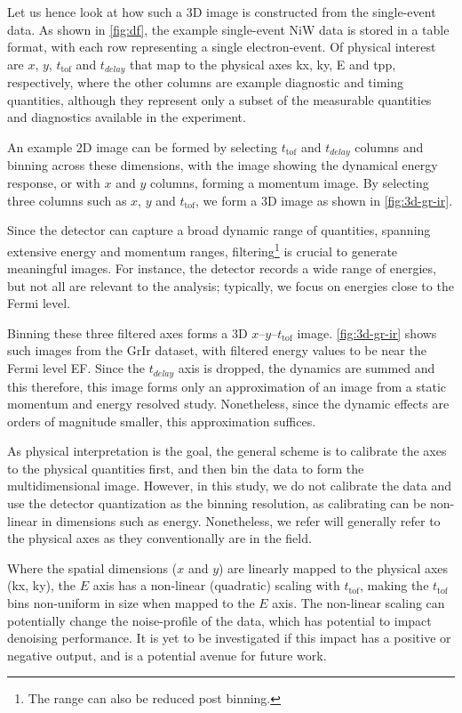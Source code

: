Let us hence look at how such a 3D image is constructed from the single-event data. As shown in \cref{fig:df}, the example single-event \gls{NiW} data is stored in a table format, with each row representing a single electron-event. Of physical interest are $x$, $y$, $t_{\text{tof}}$ and $t_{delay}$ that map to the physical axes \gls{kx}, \gls{ky}, \gls{E} and \gls{tpp}, respectively, where the other columns are example diagnostic and timing quantities, although they represent only a subset of the measurable quantities and diagnostics available in the experiment.

An example 2D image can be formed by selecting $t_{\text{tof}}$ and $t_{delay}$ columns and binning across these dimensions, with the image showing the dynamical energy response, or with $x$ and $y$ columns, forming a momentum image. By selecting three columns such as $x$, $y$ and $t_{\text{tof}}$, we form a 3D image as shown in \cref{fig:3d-gr-ir}.

Since the detector can capture a broad dynamic range of quantities, spanning extensive energy and momentum ranges, filtering\footnote{The range can also be reduced post binning.} is crucial to generate meaningful images. For instance, the detector records a wide range of energies, but not all are relevant to the analysis; typically, we focus on energies close to the Fermi level. 

Binning these three filtered axes forms a 3D $x$--$y$--$t_{\text{tof}}$ image. \cref{fig:3d-gr-ir} shows such images from the \gls{GrIr} dataset, with filtered energy values to be near the Fermi level \gls{EF}. Since the $t_{delay}$ axis is dropped, the dynamics are summed and this therefore, this image forms only an approximation of an image from a static momentum and energy resolved study. Nonetheless, since the dynamic effects are orders of magnitude smaller, this approximation suffices.

As physical interpretation is the goal, the general scheme is to calibrate the axes to the physical quantities first, and then bin the data to form the multidimensional image. However, in this study, we do not calibrate the data and use the detector quantization as the binning resolution, as calibrating can be non-linear in dimensions such as energy. Nonetheless, we refer will generally refer to the physical axes as they conventionally are in the field.

Where the spatial dimensions ($x$ and $y$) are linearly mapped to the physical axes (\gls{kx}, \gls{ky}), the $E$ axis has a non-linear (quadratic) scaling with $t_{\text{tof}}$, making the $t_{\text{tof}}$ bins non-uniform in size when mapped to the $E$ axis. The non-linear scaling can potentially change the noise-profile of the data, which has potential to impact denoising performance. It is yet to be investigated if this impact has a positive or negative output, and is a potential avenue for future work.

